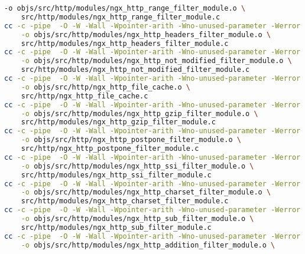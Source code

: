 \begin{lstlisting}[language=bash]
	-o objs/src/http/modules/ngx_http_range_filter_module.o \
	src/http/modules/ngx_http_range_filter_module.c
cc -c -pipe  -O -W -Wall -Wpointer-arith -Wno-unused-parameter -Werror -g  -I src/core -I src/event -I src/event/modules -I src/os/unix -I objs -I src/http -I src/http/modules \
	-o objs/src/http/modules/ngx_http_headers_filter_module.o \
	src/http/modules/ngx_http_headers_filter_module.c
cc -c -pipe  -O -W -Wall -Wpointer-arith -Wno-unused-parameter -Werror -g  -I src/core -I src/event -I src/event/modules -I src/os/unix -I objs -I src/http -I src/http/modules \
	-o objs/src/http/modules/ngx_http_not_modified_filter_module.o \
	src/http/modules/ngx_http_not_modified_filter_module.c
cc -c -pipe  -O -W -Wall -Wpointer-arith -Wno-unused-parameter -Werror -g  -I src/core -I src/event -I src/event/modules -I src/os/unix -I objs -I src/http -I src/http/modules \
	-o objs/src/http/ngx_http_file_cache.o \
	src/http/ngx_http_file_cache.c
cc -c -pipe  -O -W -Wall -Wpointer-arith -Wno-unused-parameter -Werror -g  -I src/core -I src/event -I src/event/modules -I src/os/unix -I objs -I src/http -I src/http/modules \
	-o objs/src/http/modules/ngx_http_gzip_filter_module.o \
	src/http/modules/ngx_http_gzip_filter_module.c
cc -c -pipe  -O -W -Wall -Wpointer-arith -Wno-unused-parameter -Werror -g  -I src/core -I src/event -I src/event/modules -I src/os/unix -I objs -I src/http -I src/http/modules \
	-o objs/src/http/ngx_http_postpone_filter_module.o \
	src/http/ngx_http_postpone_filter_module.c
cc -c -pipe  -O -W -Wall -Wpointer-arith -Wno-unused-parameter -Werror -g  -I src/core -I src/event -I src/event/modules -I src/os/unix -I objs -I src/http -I src/http/modules \
	-o objs/src/http/modules/ngx_http_ssi_filter_module.o \
	src/http/modules/ngx_http_ssi_filter_module.c
cc -c -pipe  -O -W -Wall -Wpointer-arith -Wno-unused-parameter -Werror -g  -I src/core -I src/event -I src/event/modules -I src/os/unix -I objs -I src/http -I src/http/modules \
	-o objs/src/http/modules/ngx_http_charset_filter_module.o \
	src/http/modules/ngx_http_charset_filter_module.c
cc -c -pipe  -O -W -Wall -Wpointer-arith -Wno-unused-parameter -Werror -g  -I src/core -I src/event -I src/event/modules -I src/os/unix -I objs -I src/http -I src/http/modules \
	-o objs/src/http/modules/ngx_http_sub_filter_module.o \
	src/http/modules/ngx_http_sub_filter_module.c
cc -c -pipe  -O -W -Wall -Wpointer-arith -Wno-unused-parameter -Werror -g  -I src/core -I src/event -I src/event/modules -I src/os/unix -I objs -I src/http -I src/http/modules \
	-o objs/src/http/modules/ngx_http_addition_filter_module.o \

\end{lstlisting}
